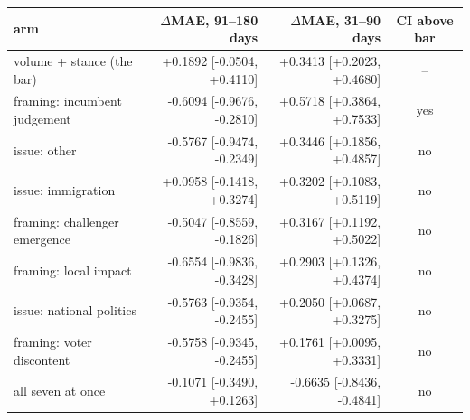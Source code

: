 \begin{tabular}{lrrc}
\toprule
arm & $\Delta$MAE, 91--180 days & $\Delta$MAE, 31--90 days & CI above bar \\
\midrule
volume + stance (the bar) & +0.1892 [-0.0504, +0.4110] & +0.3413 [+0.2023, +0.4680] & -- \\
framing: incumbent judgement & -0.6094 [-0.9676, -0.2810] & +0.5718 [+0.3864, +0.7533] & yes \\
issue: other & -0.5767 [-0.9474, -0.2349] & +0.3446 [+0.1856, +0.4857] & no \\
issue: immigration & +0.0958 [-0.1418, +0.3274] & +0.3202 [+0.1083, +0.5119] & no \\
framing: challenger emergence & -0.5047 [-0.8559, -0.1826] & +0.3167 [+0.1192, +0.5022] & no \\
framing: local impact & -0.6554 [-0.9836, -0.3428] & +0.2903 [+0.1326, +0.4374] & no \\
issue: national politics & -0.5763 [-0.9354, -0.2455] & +0.2050 [+0.0687, +0.3275] & no \\
framing: voter discontent & -0.5758 [-0.9345, -0.2455] & +0.1761 [+0.0095, +0.3331] & no \\
all seven at once & -0.1071 [-0.3490, +0.1263] & -0.6635 [-0.8436, -0.4841] & no \\
\bottomrule
\end{tabular}
